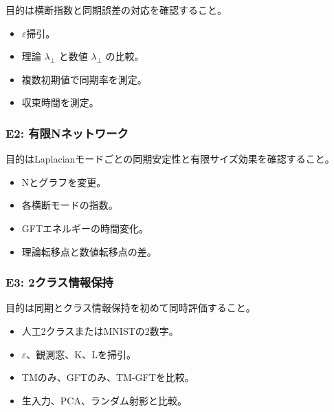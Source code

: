 \documentclass[11pt,a4paper]{ltjsarticle}
\begin{document}
目的は横断指数と同期誤差の対応を確認すること。\par

\begin{itemize}

\item \(\varepsilon\)掃引。

\item 理論 \(\lambda_{\perp}\) と数値 \(\lambda_{\perp}\) の比較。

\item 複数初期値で同期率を測定。

\item 収束時間を測定。

\end{itemize}

\subsubsection*{\textcolor{researchteal}{E2: 有限Nネットワーク}}

目的はLaplacianモードごとの同期安定性と有限サイズ効果を確認すること。\par

\begin{itemize}

\item Nとグラフを変更。

\item 各横断モードの指数。

\item GFTエネルギーの時間変化。

\item 理論転移点と数値転移点の差。

\end{itemize}

\subsubsection*{\textcolor{researchteal}{E3: 2クラス情報保持}}

目的は同期とクラス情報保持を初めて同時評価すること。\par

\begin{itemize}

\item 人工2クラスまたはMNISTの2数字。

\item \(\varepsilon\)、観測窓、K、Lを掃引。

\item TMのみ、GFTのみ、TM-GFTを比較。

\item 生入力、PCA、ランダム射影と比較。

\end{itemize}
\end{document}
